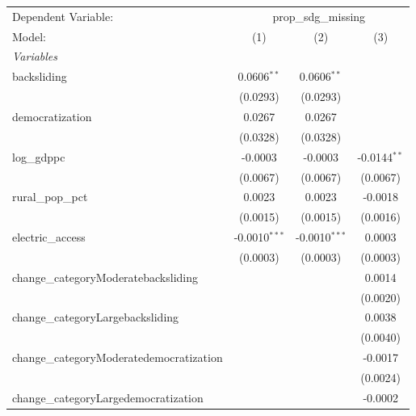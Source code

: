 
\begingroup
\centering
\begin{tabular}{lccc}
   \tabularnewline \midrule \midrule
   Dependent Variable: & \multicolumn{3}{c}{prop\_sdg\_missing}\\
   Model:                                   & (1)             & (2)             & (3)\\  
   \midrule
   \emph{Variables}\\
   backsliding                              & 0.0606$^{**}$   & 0.0606$^{**}$   &   \\   
                                            & (0.0293)        & (0.0293)        &   \\   
   democratization                          & 0.0267          & 0.0267          &   \\   
                                            & (0.0328)        & (0.0328)        &   \\   
   log\_gdppc                               & -0.0003         & -0.0003         & -0.0144$^{**}$\\   
                                            & (0.0067)        & (0.0067)        & (0.0067)\\   
   rural\_pop\_pct                          & 0.0023          & 0.0023          & -0.0018\\   
                                            & (0.0015)        & (0.0015)        & (0.0016)\\   
   electric\_access                         & -0.0010$^{***}$ & -0.0010$^{***}$ & 0.0003\\   
                                            & (0.0003)        & (0.0003)        & (0.0003)\\   
   change\_categoryModeratebacksliding      &                 &                 & 0.0014\\   
                                            &                 &                 & (0.0020)\\   
   change\_categoryLargebacksliding         &                 &                 & 0.0038\\   
                                            &                 &                 & (0.0040)\\   
   change\_categoryModeratedemocratization  &                 &                 & -0.0017\\   
                                            &                 &                 & (0.0024)\\   
   change\_categoryLargedemocratization     &                 &                 & -0.0002\\   

\end{tabular}
